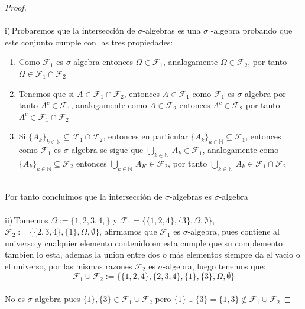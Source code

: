 \documentclass[11pt,letterpaper]{article}
\newcommand{\N}{\mathbb{N}}
\begin{document}
\begin{proof}\,\\
    \,\\
    i)\,Probaremos que la intersecci\'on de $\sigma$-algebras es una $\sigma$ -algebra probando que este conjunto cumple con las tres propiedades:\,\\
    \begin{enumerate}
        \item  Como $\mathcal{F}_1$ es $\sigma$-algebra entonces $\Omega\in \mathcal{F}_1$, analogamente $\Omega \in \mathcal{F}_2$, por tanto $\Omega\in \mathcal{F}_1 \cap \mathcal{F}_2$
        \item Tenemos que si $A\in \mathcal{F}_1\cap \mathcal{F}_2$, entonces $A\in \mathcal{F}_1$ como $\mathcal{F}_1$ es $\sigma$-algebra por tanto $A^c\in \mathcal{F}_1$, analogamente como $A\in \mathcal{F}_2$ entonces $A^c\in \mathcal{F}_2$ por tanto $A^c\in \mathcal{F}_1\cap \mathcal{F}_2$
        \item Si $\{A_k\}_{k\in \N}\subseteq \mathcal{F}_1\cap \mathcal{F}_2$, entonces en particular $\{A_k\}_{k\in \N}\subseteq \mathcal{F}_1$, entonces como $\mathcal{F}_1$ es $\sigma$-algebra se sigue que $\displaystyle\bigcup_{k\in \N}\,A_k\in \mathcal{F}_1$, analogamente como $\{A_k\}_{k\in \N}\subseteq \mathcal{F}_2$ entonces $\displaystyle \bigcup_{k\in \N}\,A_K\in \mathcal{F}_2$, por tanto
        $\displaystyle \bigcup_{k\in \N}\,A_k\in \mathcal{F}_1\cap \mathcal{F}_2$
    \end{enumerate}\,\\
    Por tanto concluimos que la intersecci\'on de $\sigma$-algebras es $\sigma$-algebra\,\\
    \,\\
    ii)\,Tomemos $\Omega:=\{1,2,3,4,\}$ y $\mathcal{F}_1=\{\{1,2,4\},\{3\},\Omega,\emptyset\}$, $\mathcal{F}_2:=\{\{2,3,4\},\{1\},\Omega,\emptyset\}$, afirmamos que $\mathcal{F}_1$ es $\sigma$-algebra, pues contiene al universo y cualquier elemento contenido en esta cumple que su complemento tambien lo esta, ademas la union entre dos o más elementos siempre da el vacio o el universo, 
    por las mismas razones $\mathcal{F}_2$ es $\sigma$-algebra, luego tenemos que:\,\\
    \begin{equation*}
        \mathcal{F}_1\cup \mathcal{F}_2:=\{\{1,2,4\},\{2,3,4\},\{1\},\{3\},\Omega,\emptyset\}
    \end{equation*}\,\\
    No es $\sigma$-algebra pues $\{1\},\{3\}\in \mathcal{F}_1\cup\mathcal{F}_2$ pero $\{1\}\cup\{3\}=\{1,3\}\notin \mathcal{F}_1\cup \mathcal{F}_2$
\end{proof}\,\\
\end{document}
